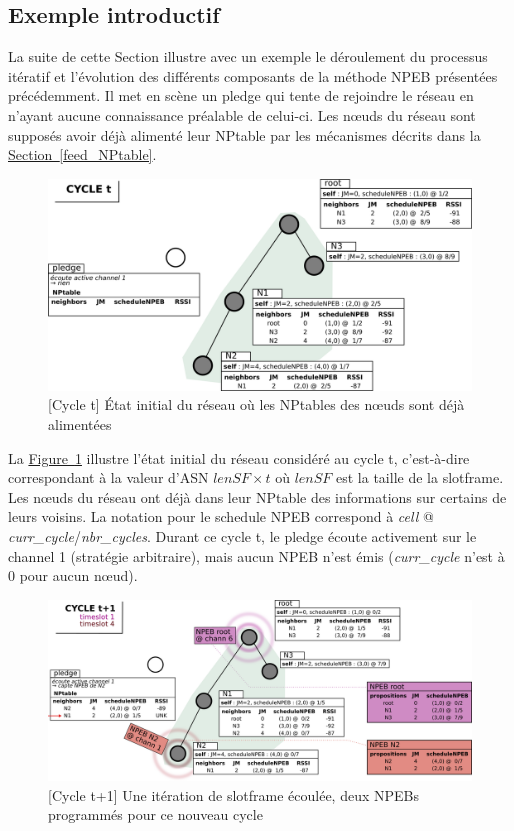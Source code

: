 \documentclass[]{report}
\newcommand{\wordlink}[2]{\hyperref[#2]{#1~\ref{#2}}}
\begin{document}
\newpage

\subsection{Exemple introductif}

La suite de cette Section illustre avec un exemple le déroulement du processus itératif et l'évolution des différents composants de la méthode NPEB présentées précédemment. Il met en scène un pledge qui tente de rejoindre le réseau en n'ayant aucune connaissance préalable de celui-ci. Les nœuds du réseau sont supposés avoir déjà alimenté leur NPtable par les mécanismes décrits dans la \wordlink{Section}{feed_NPtable}.

 \vspace{0.2cm}
	\begin{figure}[!h]
	\centering
	\includegraphics[width=0.85\linewidth]{NPEB_step1}
	\caption{[Cycle t] État initial du réseau où les NPtables des nœuds sont déjà alimentées}
	\label{fig:NPEB_step1}
	\end{figure}
\vspace{0.2cm}

La \wordlink{Figure}{fig:NPEB_step1} illustre l'état initial du réseau considéré au cycle t, c'est-à-dire correspondant à la valeur d'ASN $lenSF \times t$ où $lenSF$ est la taille de la slotframe. Les nœuds du réseau ont déjà dans leur NPtable des informations sur certains de leurs voisins. La notation pour le schedule NPEB correspond à \textit{cell} @ \textit{curr\_cycle}/\textit{nbr\_cycles}. Durant ce cycle t, le pledge écoute activement sur le channel 1 (stratégie arbitraire), mais aucun NPEB n'est émis (\textit{curr\_cycle} n'est à 0 pour aucun nœud).

 \vspace{0.6cm}
	\begin{figure}[!h]
	\centering
	\includegraphics[width=\linewidth]{NPEB_step2}
	\caption{[Cycle t+1] Une itération de slotframe écoulée, deux NPEBs programmés pour ce nouveau cycle}
	\label{fig:NPEB_step2}
	\end{figure}
\vspace{0.2cm}
\end{document}
